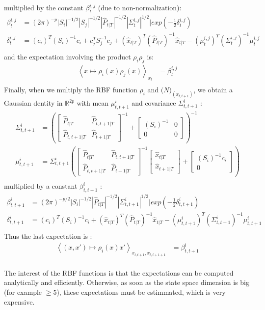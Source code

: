 multiplied by the constant $\beta^{i,j}_t$ (due to non-normalization):
\begin{align*}
  \beta^{i,j}_t &= (2\pi)^{-p} |S_i|^{-1/2} |S_j|^{-1/2} |\hat{P}_{t|T}|^{-1/2} |\Sigma^{i,j}_t|^{1/2}| exp(-\frac{1}{2} \delta^{i,j}_t)\\
  \delta^{i,j}_t &= (c_i)^T (S_i)^{-1} c_i + c_j^T S_j^{-1} c_j + (\hat{x}_{t|T})^T (\hat{P}_{t|T})^{-1} \hat{x}_{t|T} - (\mu^{i,j}_t)^T (\Sigma^{i,j}_t)^{-1} \mu^{i,j}_t\\
\end{align*}
and the expectation involving the product $\rho_i \rho_j$ is:
\begin{align*}
  \left< x \mapsto \rho_i(x)\rho_j(x)\right>_{x_t} &= \beta^{i,j}_t\\
\end{align*}
Finally, when we multiply the RBF function $\rho_i$ and $\mathcal(N)_{(x_{t,t+1})}$, we obtain a Gaussian dentity in $\mathbb{R}^{2p}$ with mean $\mu^i_{t,t+1}$ and covariance $\Sigma^i_{t,t+1}$ :
\begin{align*}
  \Sigma^i_{t,t+1} &=
    \left(
      \left[
        \begin{array}{cc} \hat{P}_{t|T} & \hat{P}_{t,t+1|T}\\ \hat{P}_{t,t+1|T} & \hat{P}_{t+1|T} \end{array}
      \right]^{-1}
       +
      \left[
        \begin{array}{cc} (S_i)^{-1} & 0\\ 0 & 0 \end{array}
      \right]
    \right)^{-1}
  \\
  \mu^i_{t,t+1} &= \Sigma^i_{t,t+1}
    \left(
      \left[
        \begin{array}{cc} \hat{P}_{t|T} & \hat{P}_{t,t+1|T}\\ \hat{P}_{t,t+1|T} & \hat{P}_{t+1|T} \end{array}
      \right]^{-1}
      \left[
        \begin{array}{c} \hat{x}_{t|T} \\ \hat{x}_{t+1|T} \end{array}
      \right] +
      \left[
        \begin{array}{c} (S_i)^{-1}c_i \\ 0 \end{array}
      \right]
    \right)
  \\
\end{align*}
multiplied by a constant $\beta^{i}_{t,t+1}$ :
\begin{align*}
  \beta^i_{t,t+1} &= (2\pi)^{-p/2} |S_i|^{-1/2} |\hat{P}_{t|T}|^{-1/2} |\Sigma^i_{t,t+1}|^{1/2}| exp(-\frac{1}{2} \delta^i_{t,t+1})\\
  \delta^i_{t,t+1} &= (c_i)^T (S_i)^{-1} c_i + (\hat{x}_{t|T})^T (\hat{P}_{t|T})^{-1} \hat{x}_{t|T} - (\mu^i_{t,t+1})^T (\Sigma^i_{t,t+1})^{-1} \mu^i_{t,t+1}\\
\end{align*}
Thus the last expectation is :
\begin{align*}
  \left< (x,x') \mapsto \rho_i(x) x' \right>_{x_{t,t+1},x_{t,t+1+1}} &= \beta^i_{t,t+1}\\
\end{align*}

The interest of the RBF functions is that the expectations can be computed analytically and efficiently.
Otherwise, as soon as the state space dimension is big (for example $\geq 5$), these expectations must be estimmated, which is very expensive.
